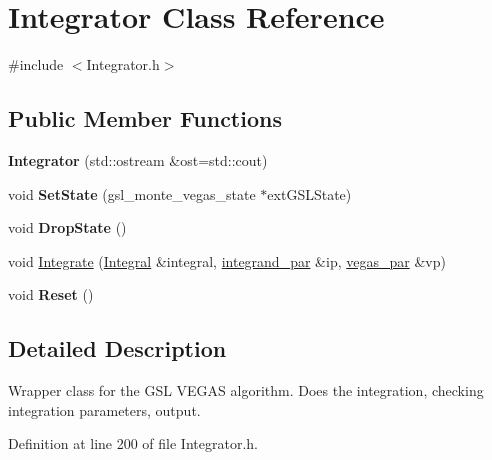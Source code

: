 \hypertarget{classIntegrator}{\section{Integrator Class Reference}
\label{classIntegrator}
}


{\ttfamily \#include $<$Integrator.\-h$>$}

\subsection*{Public Member Functions}
\begin{DoxyCompactItemize}
\item 
\hypertarget{classIntegrator_a410d73f69871a01a49401a6705325a46}{{\bfseries Integrator} (std\-::ostream \&ost=std\-::cout)}\label{classIntegrator_a410d73f69871a01a49401a6705325a46}

\item 
\hypertarget{classIntegrator_aa4e70784278ed8a0e07bb59a153a4098}{void {\bfseries Set\-State} (gsl\-\_\-monte\-\_\-vegas\-\_\-state $\ast$ext\-G\-S\-L\-State)}\label{classIntegrator_aa4e70784278ed8a0e07bb59a153a4098}

\item 
\hypertarget{classIntegrator_a7abd0680a883e614c1e6344c8fda5360}{void {\bfseries Drop\-State} ()}\label{classIntegrator_a7abd0680a883e614c1e6344c8fda5360}

\item 
void \hyperlink{classIntegrator_a999142aeac7e98ab084eaad2c257a233}{Integrate} (\hyperlink{classIntegral}{Integral} \&integral, \hyperlink{classintegrand__par}{integrand\-\_\-par} \&ip, \hyperlink{classvegas__par}{vegas\-\_\-par} \&vp)
\item 
\hypertarget{classIntegrator_ac9ea33447f83278d1bd1dd37ac70e30e}{void {\bfseries Reset} ()}\label{classIntegrator_ac9ea33447f83278d1bd1dd37ac70e30e}

\end{DoxyCompactItemize}


\subsection{Detailed Description}
Wrapper class for the G\-S\-L V\-E\-G\-A\-S algorithm. Does the integration, checking integration parameters, output. 

Definition at line 200 of file Integrator.\-h.



